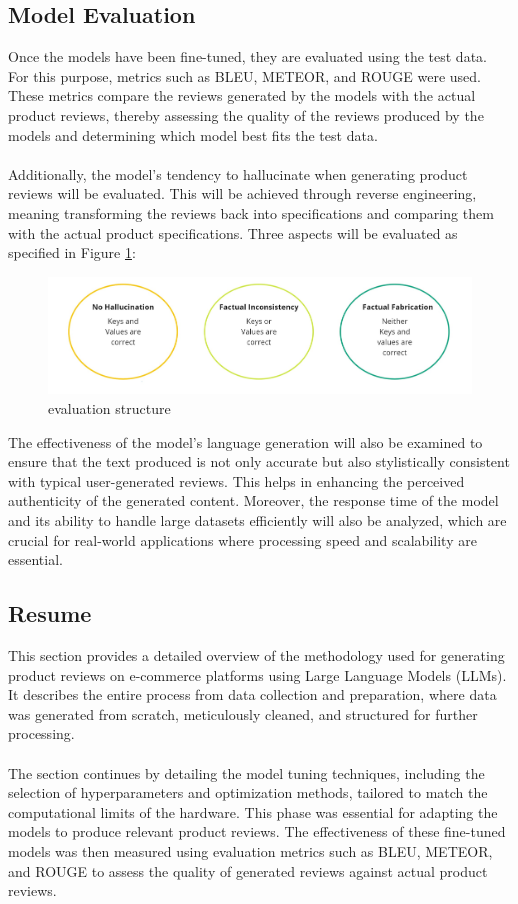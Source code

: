 \subsection{Model Evaluation}
Once the models have been fine-tuned, they are evaluated using the test data. For this purpose, metrics such as BLEU, METEOR, and ROUGE were used. These metrics compare the reviews generated by the models with the actual product reviews, thereby assessing the quality of the reviews produced by the models and determining which model best fits the test data.
\\\\
Additionally, the model's tendency to hallucinate when generating product reviews will be evaluated. This will be achieved through reverse engineering, meaning transforming the reviews back into specifications and comparing them with the actual product specifications. Three aspects will be evaluated as specified in Figure \ref{fig:evaluation-structure}:
\begin{figure}[H]
    \centering
    \includegraphics[width=12cm]{images/evaluation_structure.jpg}
    \caption{evaluation structure}
    \label{fig:evaluation-structure}
\end{figure}
The effectiveness of the model's language generation will also be examined to ensure that the text produced is not only accurate but also stylistically consistent with typical user-generated reviews. This helps in enhancing the perceived authenticity of the generated content. Moreover, the response time of the model and its ability to handle large datasets efficiently will also be analyzed, which are crucial for real-world applications where processing speed and scalability are essential.

\subsection{Resume}
This section provides a detailed overview of the methodology used for generating product reviews on e-commerce platforms using Large Language Models (LLMs). It describes the entire process from data collection and preparation, where data was generated from scratch, meticulously cleaned, and structured for further processing.
\\\\
The section continues by detailing the model tuning techniques, including the selection of hyperparameters and optimization methods, tailored to match the computational limits of the hardware. This phase was essential for adapting the models to produce relevant product reviews. The effectiveness of these fine-tuned models was then measured using evaluation metrics such as BLEU, METEOR, and ROUGE to assess the quality of generated reviews against actual product reviews.